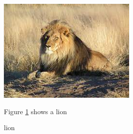 \documentclass{article}
\begin{document}
	\begin{figure}
	\includegraphics[width=\linewidth]{lion}
		\caption{lion}
\label{fig:lion1}

Figure \ref{fig:lion1} shows a lion   
 \end{figure}	
\end{document}

